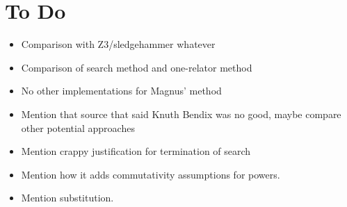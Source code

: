 \documentclass[11pt]{article} %
\theoremstyle{definition}
\theoremstyle{definition}
\theoremstyle{definition}
\theoremstyle{definition}
\theoremstyle{definition}
\theoremstyle{definition}
\begin{document}
\section{To Do}
\begin{itemize}
  \item Comparison with Z3/sledgehammer whatever
  \item Comparison of search method and one-relator method
  \item No other implementations for Magnus' method
  \item Mention that source that said Knuth Bendix was no good, maybe compare
    other potential approaches
  \item Mention crappy justification for termination of search
  \item Mention how it adds commutativity assumptions for powers.
  \item Mention substitution.
\end{itemize}


\end{document}
